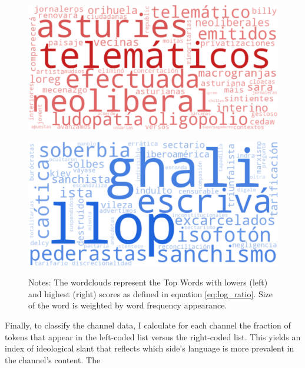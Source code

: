 \documentclass[12pt]{article}
\begin{document}
	\begin{figure}[H]
		\centering
		\begin{minipage}{0.46\textwidth}
						\label{fig:wordcloud1}
			\centering
			\includegraphics[width=\linewidth]{figures/congress_left.pdf}

		\end{minipage}
		\hspace{0.04\textwidth}
		\begin{minipage}{0.46\textwidth}
						\label{fig:worcloud2}
			\centering
			\includegraphics[width=\linewidth]{figures/congress_right.pdf}


		\end{minipage}
		\caption*{\small Notes: The wordclouds represent the Top Words with lowers (left) and highest (right) scores as defined in equation \ref{eq:log_ratio}. Size of the word is weighted by word frequency appearance.  }
	\end{figure}
	
	
	
	
	
	Finally, to classify the channel data, I calculate for each channel the fraction of tokens that appear in the left-coded list versus the right-coded list. This yields an index of ideological slant that reflects which side's language is more prevalent in the channel’s content. The 
	
\end{document}
